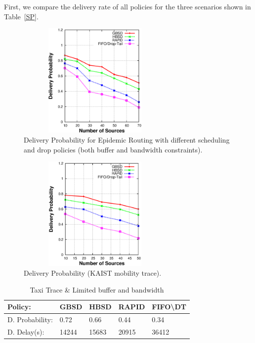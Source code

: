 First, we compare the delivery rate of all policies for the three scenarios shown in Table~\ref{SP}.

\begin{figure}[!h]
\centering
\includegraphics[width=3in,height=2.2in]{Chapitre3/fig2.eps}
\small
\caption{Delivery Probability for Epidemic Routing with different scheduling and drop policies (both buffer and bandwidth constraints).}\normalsize
\label{DR-RWP}
\end{figure}

\begin{figure}[!h]
\centering
\includegraphics[width=3in,height=2.2in]{Chapitre3/fig22.eps}
\small
\caption{Delivery Probability (KAIST mobility trace).}
\normalsize
\label{DR-KAIST}
\end{figure}

\begin{table}[!h]
\renewcommand{\arraystretch}{1.1}
\caption{Taxi Trace \& Limited buffer and bandwidth}
\centering
\footnotesize
\begin{tabular}{|p{2.5cm}||p{0.9cm}||p{0.9cm}||p{0.9cm}||p{1.5cm}|}
\hline
\bfseries Policy: & GBSD & HBSD & RAPID & FIFO\textbackslash DT\\
\hline\hline
D. Probability:&0.72 &0.66 &0.44 &0.34\\
\hline\hline
D. Delay(s):&14244&15683&20915&36412\\
\hline
\end{tabular}
\label{T-LB+LB}
\end{table}

